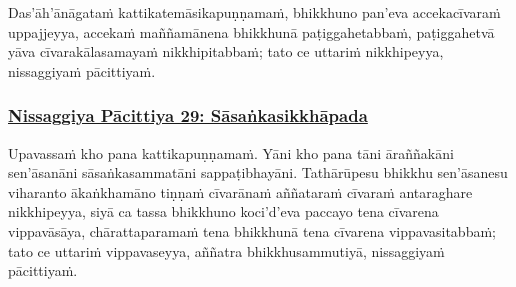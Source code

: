 Das'āh'ānāgataṁ kattikatemāsikapuṇṇamaṁ,\makeatletter\hyperlink{endnote215-appendix}\makeatother{} bhikkhuno pan'eva accekacīvaraṁ uppajjeyya, accekaṁ maññamānena bhikkhunā paṭiggahetabbaṁ, paṭiggahetvā yāva cīvarakālasamayaṁ nikkhipitabbaṁ; tato ce uttariṁ\makeatletter\hyperlink{endnote216-appendix}\makeatother{} nikkhipeyya, nissaggiyaṁ pācittiyaṁ.



\subsubsection*{\hyperref[forf-exp29]{Nissaggiya Pācittiya 29: Sāsaṅkasikkhāpada}}
\label{np29}

Upavassaṁ kho pana kattikapuṇṇamaṁ. Yāni kho pana tāni āraññakāni sen'āsanāni sāsaṅkasammatāni\makeatletter\hyperlink{endnote217-appendix}\makeatother{} sappaṭibhayāni. Tathārūpesu bhikkhu sen'āsanesu viharanto ākaṅkhamāno tiṇṇaṁ cīvarānaṁ aññataraṁ cīvaraṁ antaraghare nikkhipeyya, siyā ca tassa bhikkhuno koci'd'eva paccayo tena cīvarena vippavāsāya, chārattaparamaṁ\makeatletter\hyperlink{endnote218-appendix}\makeatother{} tena bhikkhunā tena cīvarena vippavasitabbaṁ; tato ce uttariṁ\makeatletter\hyperlink{endnote219-appendix}\makeatother{} vippavaseyya, aññatra bhikkhusammutiyā,\makeatletter\hyperlink{endnote220-appendix}\makeatother{} nissaggiyaṁ pācittiyaṁ.



